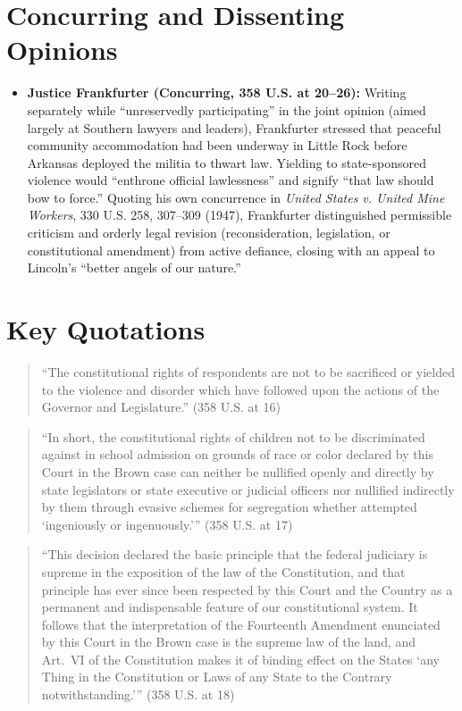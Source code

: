 \documentclass[12pt]{article}
\begin{document}
\section{Concurring and Dissenting Opinions}
\begin{itemize}
  \item \textbf{Justice Frankfurter (Concurring, 358 U.S. at 20--26):} Writing separately while ``unreservedly participating'' in the joint opinion (aimed largely at Southern lawyers and leaders), Frankfurter stressed that peaceful community accommodation had been underway in Little Rock before Arkansas deployed the militia to thwart law. Yielding to state-sponsored violence would ``enthrone official lawlessness'' and signify ``that law should bow to force.'' Quoting his own concurrence in \textit{United States v. United Mine Workers}, 330 U.S. 258, 307--309 (1947), Frankfurter distinguished permissible criticism and orderly legal revision (reconsideration, legislation, or constitutional amendment) from active defiance, closing with an appeal to Lincoln's ``better angels of our nature.''
\end{itemize}

\section{Key Quotations}
\begin{quote}
``The constitutional rights of respondents are not to be sacrificed or yielded to the violence and disorder which have followed upon the actions of the Governor and Legislature.'' (358 U.S. at 16)
\end{quote}

\begin{quote}
``In short, the constitutional rights of children not to be discriminated against in school admission on grounds of race or color declared by this Court in the Brown case can neither be nullified openly and directly by state legislators or state executive or judicial officers nor nullified indirectly by them through evasive schemes for segregation whether attempted `ingeniously or ingenuously.''' (358 U.S. at 17)
\end{quote}

\begin{quote}
``This decision declared the basic principle that the federal judiciary is supreme in the exposition of the law of the Constitution, and that principle has ever since been respected by this Court and the Country as a permanent and indispensable feature of our constitutional system. It follows that the interpretation of the Fourteenth Amendment enunciated by this Court in the Brown case is the supreme law of the land, and Art.\ VI of the Constitution makes it of binding effect on the States `any Thing in the Constitution or Laws of any State to the Contrary notwithstanding.''' (358 U.S. at 18)
\end{quote}
\end{document}
